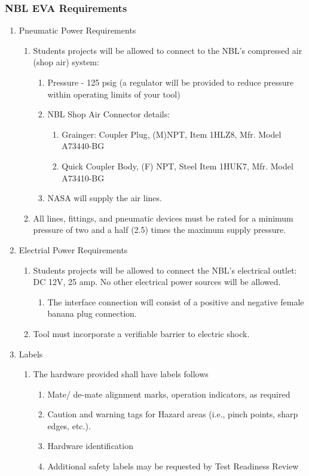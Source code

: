 \documentclass{article}
\begin{document}
\subsubsection{NBL EVA Requirements}
\begin{enumerate}
    \item Pneumatic Power Requirements
    \begin{enumerate}
        \item Students projects will be allowed to connect to the NBL's compressed air (shop air) system:
        \begin{enumerate}
            \item Pressure - 125 psig (a regulator will be provided to reduce pressure within operating limits of your tool)
            \item NBL Shop Air Connector details:
            \begin{enumerate}
                \item Grainger: Coupler Plug, (M)NPT, Item 1HLZ8, Mfr. Model A73440-BG
                \item Quick Coupler Body, (F) NPT, Steel Item 1HUK7, Mfr. Model A73410-BG
            \end{enumerate}
            \item NASA will supply the air lines.
        \end{enumerate}
        \item All lines, fittings, and pneumatic devices must be rated for a minimum pressure of two and a half (2.5) times the maximum supply pressure.
    \end{enumerate}
    \item Electrial Power Requirements
    \begin{enumerate}
        \item Students projects will be allowed to connect the NBL's electrical outlet: DC 12V, 25 amp. No other electrical power sources will be allowed.
        \begin{enumerate}
            \item The interface connection will consist of a positive and negative female banana plug connection.
        \end{enumerate}
        \item Tool must incorporate a verifiable barrier to electric shock.
    \end{enumerate}
    \item Labels
    \begin{enumerate}
        \item The hardware provided shall have labels follows
        \begin{enumerate}
            \item Mate/ de-mate alignment marks, operation indicators, as required
            \item Caution and warning tags for Hazard areas (i.e., pinch points, sharp edges, etc.).
            \item Hardware identification
            \item Additional safety labels may be requested by Test Readiness Review
        \end{enumerate}
    \end{enumerate}
\end{enumerate}
\end{document}
